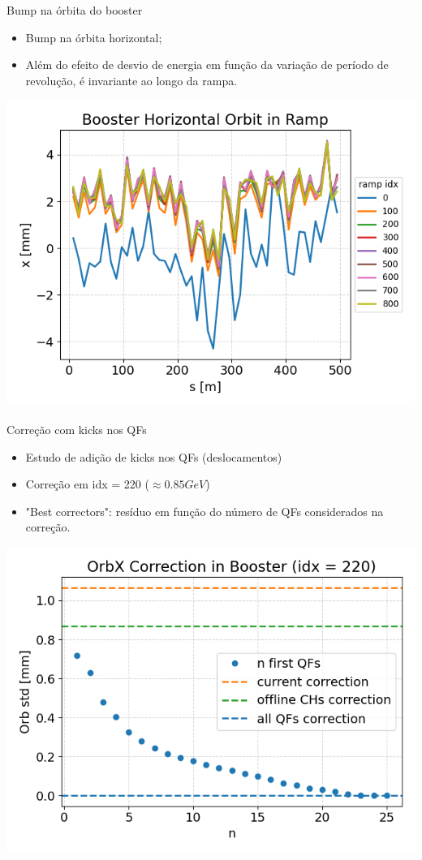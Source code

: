 \documentclass[1611]{beamer}            %
\begin{document}
\begin{frame}{Bump na órbita do booster}
\vspace{0.5cm}
\begin{itemize}
    \item Bump na órbita horizontal;
    \item Além do efeito de desvio de energia em função da variação de período de revolução, é invariante ao longo da rampa.
\vspace{0.5cm}
\end{itemize}
\centering
    \includegraphics[scale=0.5]{2024-05-10/figures/bo-orbit.png}
\end{frame}

\begin{frame}{Correção com kicks nos QFs}
\vspace{0.5cm}
\begin{itemize}
    \item Estudo de adição de kicks nos QFs (deslocamentos)
    \item Correção em idx = 220 ($\approx 0.85 GeV$)
    \item "Best correctors": resíduo em função do número de QFs considerados na correção.
\vspace{0.5cm}
\end{itemize}
\centering
    \includegraphics[scale=0.5]{2024-05-10/figures/qfs-correction.png}
\end{frame}
\end{document}
